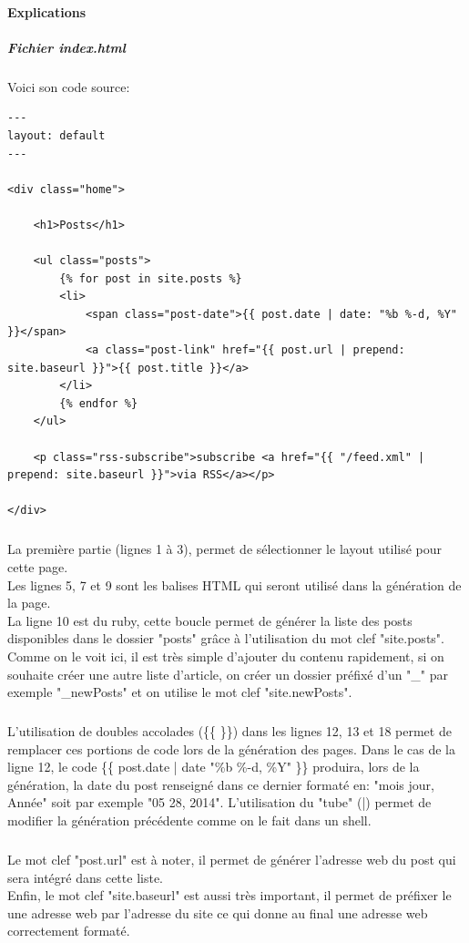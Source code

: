 \documentclass[11pt,a4paper]{report}
\begin{document}
			\paragraph{Explications}
				\subparagraph{Fichier index.html}Voici son code source:
					\begin{lstlisting}
---
layout: default
---

<div class="home">

	<h1>Posts</h1>

	<ul class="posts">
		{% for post in site.posts %}
		<li>
			<span class="post-date">{{ post.date | date: "%b %-d, %Y" }}</span>
			<a class="post-link" href="{{ post.url | prepend: site.baseurl }}">{{ post.title }}</a>
		</li>
		{% endfor %}
	</ul>

	<p class="rss-subscribe">subscribe <a href="{{ "/feed.xml" | prepend: site.baseurl }}">via RSS</a></p>

</div>
					\end{lstlisting}
				\subparagraph*{}La première partie (lignes 1 à 3), permet de sélectionner le layout utilisé pour cette page.\\
				Les lignes 5, 7 et 9 sont les balises HTML qui seront utilisé dans la génération de la page.\\
				La ligne 10 est du ruby, cette boucle permet de générer la liste des posts disponibles dans le dossier "posts" grâce à l'utilisation du mot clef "site.posts". Comme on le voit ici, il est très simple d'ajouter du contenu rapidement, si on souhaite créer une autre liste d'article, on créer un dossier préfixé d'un "\_" par exemple "\_newPosts" et on utilise le mot clef "site.newPosts".
				\subparagraph*{}L'utilisation de doubles accolades (\{\{ \}\}) dans les lignes 12, 13 et 18 permet de remplacer ces portions de code lors de la génération des pages. Dans le cas de la ligne 12, le code \{\{ post.date | date "\%b \%-d, \%Y" \}\} produira, lors de la génération, la date du post renseigné dans ce dernier formaté en: "mois jour, Année" soit par exemple "05 28, 2014". L'utilisation du "tube" (|) permet de modifier la génération précédente comme on le fait dans un shell.
				\subparagraph*{}Le mot clef "post.url" est à noter, il permet de générer l'adresse web du post qui sera intégré dans cette liste.\\
				Enfin, le mot clef "site.baseurl" est aussi très important, il permet de préfixer le une adresse web par l'adresse du site ce qui donne au final une adresse web correctement formaté.
\end{document}
